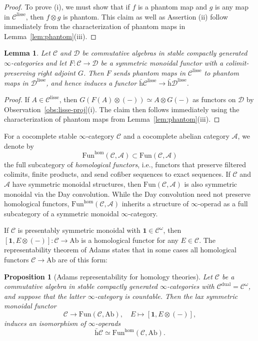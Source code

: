 \documentclass{amsart}
\numberwithin{equation}{section}
\theoremstyle{plain}
\newtheorem{proposition}[equation]{Proposition}
\newtheorem{lemma}[equation]{Lemma}
\theoremstyle{definition}
\let\scr=\mathcal
\def\1{\mathbf 1}
\def\ph{\mathord-}
\def\Ab{\mathrm{A}\mathrm{b}}
\def\Fun{\mathrm{Fun}}
\def\w{\bar{\mathrm{h}}}
\def\lisse{\mathrm{lisse}}
\def\dual{\mathrm{dual}}
\begin{document}
\begin{proof}
	To prove (i), we must show that if $f$ is a phantom map and $g$ is any map in $\scr C^\lisse$, then $f\otimes g$ is phantom. This claim as well as Assertion (ii) follow immediately from the characterization of phantom maps in Lemma~\ref{lem:phantom}(iii).
\end{proof}

\begin{lemma}\label{lem:phantom-PB}
	Let $\scr C$ and $\scr D$ be commutative algebras in stable compactly generated $\infty$-categories and let $F\colon \scr C\to\scr D$ be a symmetric monoidal functor with a colimit-preserving right adjoint $G$. Then $F$ sends phantom maps in $\scr C^\lisse$ to phantom maps in $\scr D^\lisse$, and hence induces a functor $\w\scr C^\lisse\to\w\scr D^\lisse$.
\end{lemma}

\begin{proof}
	If $A\in\scr C^\lisse$, then $G(F(A)\otimes(\ph))\simeq A\otimes G(\ph)$ as functors on $\scr D$ by Observation~\ref{obs:lisse-proj}(i).
	The claim then follows immediately using the characterization of phantom maps from Lemma~\ref{lem:phantom}(iii).
\end{proof}

For a cocomplete stable $\infty$-category $\scr C$ and a cocomplete abelian category $\scr A$, we denote by
\[
\Fun^\mathrm{hom}(\scr C,\scr A)\subset\Fun(\scr C,\scr A)
\]
the full subcategory of \emph{homological functors}, i.e., functors that preserve filtered colimits, finite products, and send cofiber sequences to exact sequences. 
If $\scr C$ and $\scr A$ have symmetric monoidal structures, then $\Fun(\scr C,\scr A)$ is also symmetric monoidal via the Day convolution. While the Day convolution need not preserve homological functors, $\Fun^\mathrm{hom}(\scr C,\scr A)$ inherits a structure of $\infty$-operad as a full subcategory of a symmetric monoidal $\infty$-category.

If $\scr C$ is presentably symmetric monoidal with $\1\in\scr C^\omega$, then $[\1,E\otimes(\ph)]\colon\scr C\to\Ab$ is a homological functor for any $E\in\scr C$. The representability theorem of Adams states that in some cases all homological functors $\scr C\to\Ab$ are of this form:

\begin{proposition}[Adams representability for homology theories]
	\label{prop:adams}
	Let $\scr C$ be a commutative algebra in stable compactly generated $\infty$-categories with $\scr C^\dual=\scr C^\omega$, and suppose that the latter $\infty$-category is countable. Then the lax symmetric monoidal functor
	\[
	\scr C\to \Fun(\scr C,\Ab),\quad E\mapsto [\1,E\otimes(\ph)],
	\]
	induces an isomorphism of $\infty$-operads
	\[
	\w\scr C\simeq \Fun^\mathrm{hom}(\scr C,\Ab).
	\]
\end{proposition}
\end{document}
